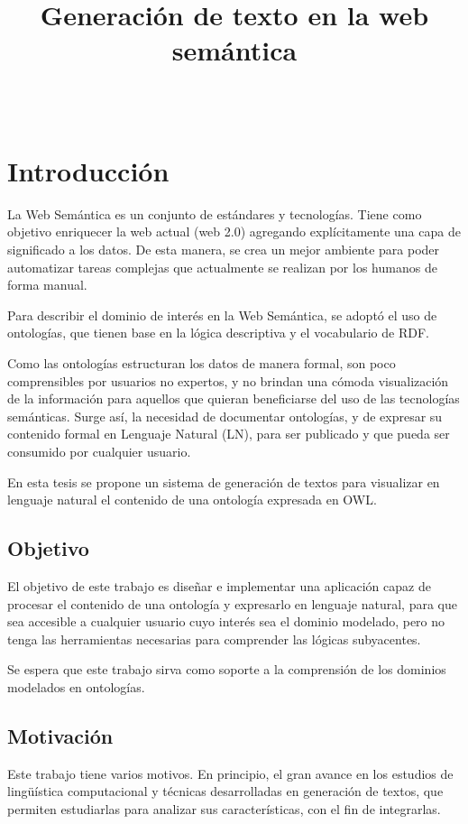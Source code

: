 \documentclass{report}
\begin{document}
	
	\title{Generación de texto en la web semántica}
	\author{\ }
	\date{}
	\maketitle
	\tableofcontents

\pagebreak
	
\chapter{Introducción}
La Web Semántica es un conjunto de estándares y tecnologías. Tiene como objetivo enriquecer la web actual (web 2.0) agregando explícitamente una capa de significado a los datos. De esta manera, se crea un mejor ambiente para poder automatizar tareas complejas que actualmente se realizan por los humanos de forma manual. 

Para describir el dominio de interés en la Web Semántica, se adoptó el uso de ontologías, que tienen base en la lógica descriptiva y el vocabulario de RDF.

Como las ontologías estructuran los datos de manera formal, son poco comprensibles por usuarios no expertos, y no brindan una cómoda visualización de la información para aquellos que quieran beneficiarse del uso de las tecnologías semánticas. Surge así, la necesidad de documentar ontologías, y de expresar su contenido formal en Lenguaje Natural (LN), para ser publicado y que pueda ser consumido por cualquier usuario. 

En esta tesis se propone un sistema de generación de textos para visualizar en lenguaje natural el contenido de una ontología expresada en OWL.

\section{Objetivo}
El objetivo de este trabajo es diseñar e implementar una aplicación capaz de procesar el contenido de una ontología y expresarlo en lenguaje natural, para que sea accesible a cualquier usuario cuyo interés sea el dominio modelado, pero no tenga las herramientas necesarias para comprender las lógicas subyacentes.

Se espera que este trabajo sirva como soporte a la comprensión de los dominios modelados en ontologías.

\section{Motivación}
Este trabajo tiene varios motivos.
En principio, el gran avance en los estudios de lingüística computacional y técnicas desarrolladas en generación de textos, que permiten estudiarlas para analizar sus características, con el fin de integrarlas.
\end{document}
